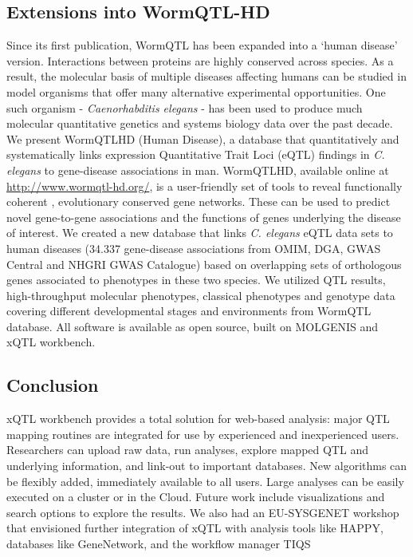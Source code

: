 \subsection{Extensions into WormQTL-HD}
Since its first publication, WormQTL has been expanded into a ‘human disease’ version. Interactions 
between proteins are highly conserved across species. As a result, the molecular basis 
of multiple diseases affecting humans can be studied in model organisms that offer many alternative 
experimental opportunities. One such organism - \emph{Caenorhabditis elegans} - has been used to produce much 
molecular quantitative genetics and systems biology data over the past decade. We present WormQTLHD 
(Human Disease), a database that quantitatively and systematically links expression Quantitative 
Trait Loci (eQTL) findings in \emph{C. elegans} to gene-disease associations in man. WormQTLHD, available 
online at \url{http://www.wormqtl-hd.org/}, is a user-friendly set of tools to reveal functionally coherent
, evolutionary conserved gene networks. These can be used to predict novel gene-to-gene associations 
and the functions of genes underlying the disease of interest. We created a new database that links 
\emph{C. elegans} eQTL data sets to human diseases (34.337 gene-disease associations from OMIM, DGA, GWAS 
Central and NHGRI GWAS Catalogue) based on overlapping sets of orthologous genes associated to 
phenotypes in these two species. We utilized QTL results, high-throughput molecular phenotypes, 
classical phenotypes and genotype data covering different developmental stages and environments from 
WormQTL database. All software is available as open source, built on MOLGENIS and xQTL workbench. 

\subsection{Conclusion}
xQTL workbench provides a total solution for web-based analysis: major QTL mapping routines are 
integrated for use by experienced and inexperienced users. Researchers can upload raw data, run 
analyses, explore mapped QTL and underlying information, and link-out to important databases. New 
algorithms can be flexibly added, immediately available to all users. Large analyses can be easily 
executed on a cluster or in the Cloud. Future work include visualizations and search options to 
explore the results. We also had an EU-SYSGENET workshop that envisioned further integration of 
xQTL with analysis tools like HAPPY, databases like GeneNetwork, and the workflow manager TIQS 
\cite{Durrant:2012}

